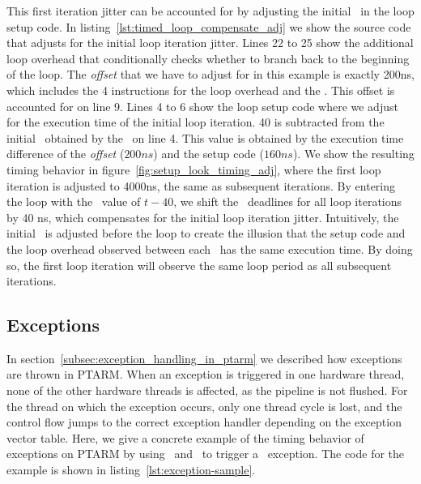 This first iteration jitter can be accounted for by adjusting the initial \deadlinet\ in the loop setup code.
In listing~\ref{lst:timed_loop_compensate_adj} we show the source code that adjusts for the initial loop iteration jitter.
Lines 22 to 25 show the additional loop overhead that conditionally checks whether to branch back to the beginning of the loop.
The \emph{offset} that we have to adjust for in this example is exactly 200ns, which includes the 4 instructions for the loop overhead and the \delayuntil. 
This offset is accounted for on line 9.
Lines 4 to 6 show the loop setup code where we adjust for the execution time of the initial loop iteration.
40 is subtracted from the initial \deadlinet\ obtained by the \gettime\ on line 4.
This value is obtained by the execution time difference of the \emph{offset} ($200ns$) and the setup code ($160ns$).
We show the resulting timing behavior in figure~\ref{fig:setup_look_timing_adj}, where the first loop iteration is adjusted to 4000ns, the same as subsequent iterations.
By entering the loop with the \deadlinet\ value of $t-40$, we shift the \delayuntil\ deadlines for all loop iterations by 40 ns, which compensates for the initial loop iteration jitter.   
Intuitively, the initial \deadlinet\ is adjusted before the loop to create the illusion that the setup code and the loop overhead observed between each \delayuntil\ has the same execution time.
By doing so, the first loop iteration will observe the same loop period as all subsequent iterations. 

\subsection{Exceptions}
\label{sec:exception_timing_example}
In section~\ref{subsec:exception_handling_in_ptarm} we described how exceptions are thrown in PTARM.
When an exception is triggered in one hardware thread, none of the other hardware threads is affected, as the pipeline is not flushed.
For the thread on which the exception occurs, only one thread cycle is lost, and the control flow jumps to the correct exception handler depending on the exception vector table.    
Here, we give a concrete example of the timing behavior of exceptions on PTARM by using \exceptiononexpire\ and \deactivateexception\ to trigger a \timerexpired\ exception.
The code for the example is shown in listing~\ref{lst:exception-sample}.

